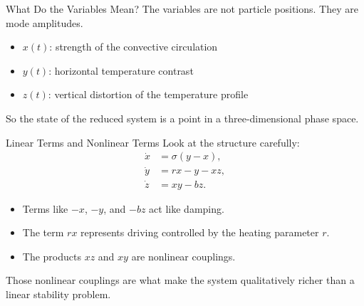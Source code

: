 \documentclass[aspectratio=169]{beamer}
\begin{document}
\begin{frame}{What Do the Variables Mean?}
The variables are not particle positions. They are mode amplitudes.

\begin{itemize}
\item $x(t)$: strength of the convective circulation
\item $y(t)$: horizontal temperature contrast
\item $z(t)$: vertical distortion of the temperature profile
\end{itemize}

So the state of the reduced system is a point in a three-dimensional phase space.
\end{frame}

\begin{frame}{Linear Terms and Nonlinear Terms}
Look at the structure carefully:
\begin{align*}
\dot{x} &= \sigma(y-x), \\
\dot{y} &= rx-y-xz, \\
\dot{z} &= xy-bz.
\end{align*}

\begin{itemize}
\item Terms like $-x$, $-y$, and $-bz$ act like damping.
\item The term $rx$ represents driving controlled by the heating parameter $r$.
\item The products $xz$ and $xy$ are nonlinear couplings.
\end{itemize}

Those nonlinear couplings are what make the system qualitatively richer than a linear stability problem.
\end{frame}
\end{document}
